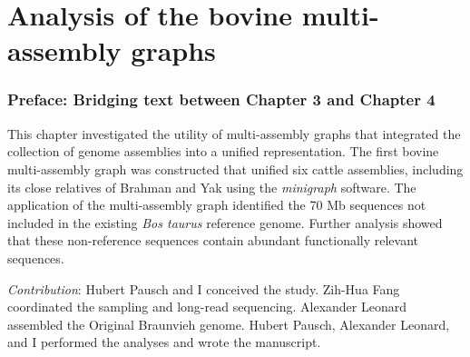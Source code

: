 \documentclass[11 pt, a4paper, notitlepage, twoside]{report}
\begin{document}



\iftwoside
\cleardoublepage
\newpage
\fi

\chapter[Bovine multi-assembly graphs]{\LARGE{Analysis of the bovine multi-assembly graphs}}
\label{chap:multigraph}

\subsection*{Preface: Bridging text between Chapter 3 and Chapter 4}

\normalsize
This chapter investigated the utility of multi-assembly graphs that integrated the collection of genome assemblies into a unified representation. The first bovine multi-assembly graph was constructed that unified six cattle assemblies, including its close relatives of Brahman and Yak using the \emph{minigraph} software. The application of the multi-assembly graph identified the 70 Mb sequences not included in the existing \emph{Bos taurus} reference genome. Further analysis showed that these non-reference sequences contain abundant functionally relevant sequences. \\

\bigskip


\emph{Contribution}: Hubert Pausch and I conceived the study. Zih-Hua Fang coordinated the sampling and long-read sequencing. Alexander Leonard assembled the Original Braunvieh genome. Hubert Pausch, Alexander Leonard, and I performed the analyses and wrote the manuscript. 

\onehalfspacing


\iftwoside
\cleardoublepage
\newpage
\fi


\chapter*{}
\singlespacing
{}

\end{document}

